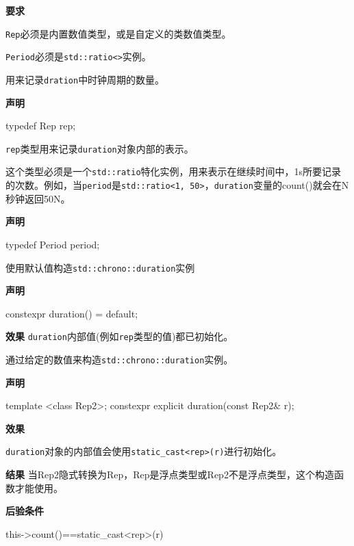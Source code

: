 \textbf{要求}

\texttt{Rep}必须是内置数值类型，或是自定义的类数值类型。

\texttt{Period}必须是\texttt{std::ratio<>}实例。


用来记录\texttt{dration}中时钟周期的数量。

\textbf{声明}

\begin{cpp}
typedef Rep rep;
\end{cpp}

\texttt{rep}类型用来记录\texttt{duration}对象内部的表示。


这个类型必须是一个\texttt{std::ratio}特化实例，用来表示在继续时间中，1s所要记录的次数。例如，当\texttt{period}是\texttt{std::ratio<1, 50>}，\texttt{duration}变量的count()就会在N秒钟返回50N。

\textbf{声明}

\begin{cpp}
typedef Period period;
\end{cpp}


使用默认值构造\texttt{std::chrono::duration}实例

\textbf{声明}

\begin{cpp}
constexpr duration() = default;
\end{cpp}

\textbf{效果}
\texttt{duration}内部值(例如\texttt{rep}类型的值)都已初始化。


通过给定的数值来构造\texttt{std::chrono::duration}实例。

\textbf{声明}

\begin{cpp}
template <class Rep2>;
constexpr explicit duration(const Rep2& r);
\end{cpp}

\textbf{效果}

\texttt{duration}对象的内部值会使用\texttt{static\_cast<rep>(r)}进行初始化。

\textbf{结果}
当Rep2隐式转换为Rep，Rep是浮点类型或Rep2不是浮点类型，这个构造函数才能使用。

\textbf{后验条件}

\begin{cpp}
this->count()==static_cast<rep>(r)
\end{cpp}

